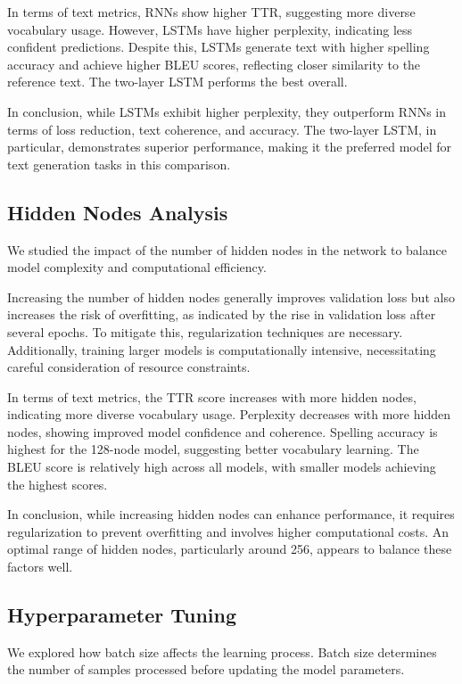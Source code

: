 \documentclass{article}
\begin{document}
In terms of text metrics, RNNs show higher TTR, suggesting more diverse vocabulary usage. However, LSTMs have higher perplexity, indicating less confident predictions. Despite this, LSTMs generate text with higher spelling accuracy and achieve higher BLEU scores, reflecting closer similarity to the reference text. The two-layer LSTM performs the best overall.

In conclusion, while LSTMs exhibit higher perplexity, they outperform RNNs in terms of loss reduction, text coherence, and accuracy. The two-layer LSTM, in particular, demonstrates superior performance, making it the preferred model for text generation tasks in this comparison. 

\subsection{Hidden Nodes Analysis}

We studied the impact of the number of hidden nodes in the network to balance model complexity and computational efficiency.

Increasing the number of hidden nodes generally improves validation loss but also increases the risk of overfitting, as indicated by the rise in validation loss after several epochs. To mitigate this, regularization techniques are necessary. Additionally, training larger models is computationally intensive, necessitating careful consideration of resource constraints.

In terms of text metrics, the TTR score increases with more hidden nodes, indicating more diverse vocabulary usage. Perplexity decreases with more hidden nodes, showing improved model confidence and coherence. Spelling accuracy is highest for the 128-node model, suggesting better vocabulary learning. The BLEU score is relatively high across all models, with smaller models achieving the highest scores.

In conclusion, while increasing hidden nodes can enhance performance, it requires regularization to prevent overfitting and involves higher computational costs. An optimal range of hidden nodes, particularly around 256, appears to balance these factors well.

\subsection{Hyperparameter Tuning}

We explored how batch size affects the learning process. Batch size determines the number of samples processed before updating the model parameters.
\end{document}
